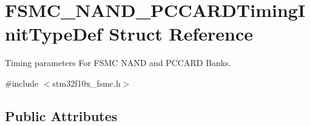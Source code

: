 \hypertarget{struct_f_s_m_c___n_a_n_d___p_c_c_a_r_d_timing_init_type_def}{}\section{F\+S\+M\+C\+\_\+\+N\+A\+N\+D\+\_\+\+P\+C\+C\+A\+R\+D\+Timing\+Init\+Type\+Def Struct Reference}
\label{struct_f_s_m_c___n_a_n_d___p_c_c_a_r_d_timing_init_type_def}


Timing parameters For F\+S\+MC N\+A\+ND and P\+C\+C\+A\+RD Banks.  




{\ttfamily \#include $<$stm32f10x\+\_\+fsmc.\+h$>$}

\subsection*{Public Attributes}
